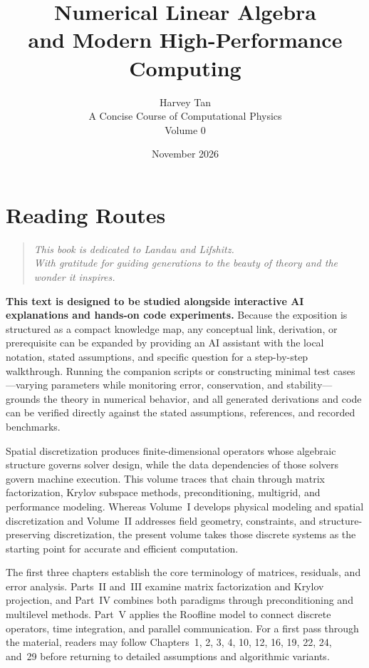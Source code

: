 \documentclass[11pt,openany]{book}
\title{Numerical Linear Algebra\\and Modern High-Performance Computing}
\author{Harvey Tan\\[0.6em]\large A Concise Course of Computational Physics\\Volume 0}
\date{November 2026}
\begin{document}
\frontmatter
\maketitle
\chapter*{Reading Routes}
\begin{quote}
\itshape
This book is dedicated to Landau and Lifshitz.\\
With gratitude for guiding generations to the beauty of theory and the wonder it inspires.
\end{quote}
\begin{tcolorbox}[colback=red!3,colframe=red!65!black,title={Using AI Explanations and Code Experiments},fonttitle=\bfseries,boxrule=0.8pt,arc=1mm,breakable]
\textbf{This text is designed to be studied alongside interactive AI explanations and hands-on code experiments.}
Because the exposition is structured as a compact knowledge map, any conceptual link, derivation, or prerequisite can be expanded by providing an AI assistant with the local notation, stated assumptions, and specific question for a step-by-step walkthrough. Running the companion scripts or constructing minimal test cases—varying parameters while monitoring error, conservation, and stability—grounds the theory in numerical behavior, and all generated derivations and code can be verified directly against the stated assumptions, references, and recorded benchmarks.
\end{tcolorbox}
Spatial discretization produces finite-dimensional operators whose algebraic structure governs solver design, while the data dependencies of those solvers govern machine execution. This volume traces that chain through matrix factorization, Krylov subspace methods, preconditioning, multigrid, and performance modeling. Whereas Volume~I develops physical modeling and spatial discretization and Volume~II addresses field geometry, constraints, and structure-preserving discretization, the present volume takes those discrete systems as the starting point for accurate and efficient computation.
\par
The first three chapters establish the core terminology of matrices, residuals, and error analysis. Parts~II and~III examine matrix factorization and Krylov projection, and Part~IV combines both paradigms through preconditioning and multilevel methods. Part~V applies the Roofline model to connect discrete operators, time integration, and parallel communication. For a first pass through the material, readers may follow Chapters~1, 2, 3, 4, 10, 12, 16, 19, 22, 24, and~29 before returning to detailed assumptions and algorithmic variants.
\end{document}
